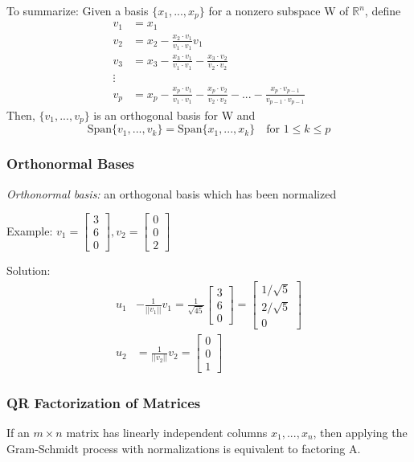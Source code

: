 \documentclass[12pt]{article} %
\newcommand{\R}{\mathbb{R}}
\begin{document}
To summarize:
Given a basis $\{x_1, ..., x_p\}$ for a nonzero subspace W of $\R^n$, define
\begin{align*}
	v_1 &= x_1\\
	v_2 &= x_2 - \frac{x_2 \cdot v_1}{v_1 \cdot v_1} v_1\\
	v_3 &= x_3 - \frac{x_3 \cdot v_1}{v_1 \cdot v_1} - \frac{x_3 \cdot v_2}{v_2 \cdot v_2}\\
	\vdots\\
	v_p &= x_p - \frac{x_p \cdot v_1}{v_1 \cdot v_1} - \frac{x_p \cdot v_2}{v_2 \cdot v_2} - ... - \frac{x_p \cdot v_{p-1}}{v_{p-1} \cdot v_{p-1}}
\end{align*}
Then, $\{v_1, ..., v_p\}$ is an orthogonal basis for W and 
$$\text{Span}\{v_1, ..., v_k\} = \text{Span}\{x_1, ..., x_k\} \quad \text{for } 1 \leq k \leq p$$ 

\subsubsection{Orthonormal Bases}
\emph{Orthonormal basis:} an orthogonal basis which has been normalized

Example: $v_1 = \begin{bmatrix}
	3\\6\\0
\end{bmatrix}, v_2 = \begin{bmatrix}
	0\\0\\2
\end{bmatrix}$

Solution:
\begin{align*}
	u_1 &- \frac{1}{||v_1||}v_1 = \frac{1}{\sqrt{45}}\begin{bmatrix}
		3\\6\\0
	\end{bmatrix} = \begin{bmatrix}
		1/\sqrt{5}\\2/\sqrt{5}\\0
	\end{bmatrix}\\
	u_2 &= \frac{1}{||v_2||}v_2 = \begin{bmatrix}
		0\\0\\1
	\end{bmatrix}
\end{align*}

\subsubsection{QR Factorization of Matrices}
If an $m \times n$ matrix has linearly independent columns $x_1, ..., x_n$, then applying the Gram-Schmidt process with normalizations is equivalent to factoring A.
\end{document}
